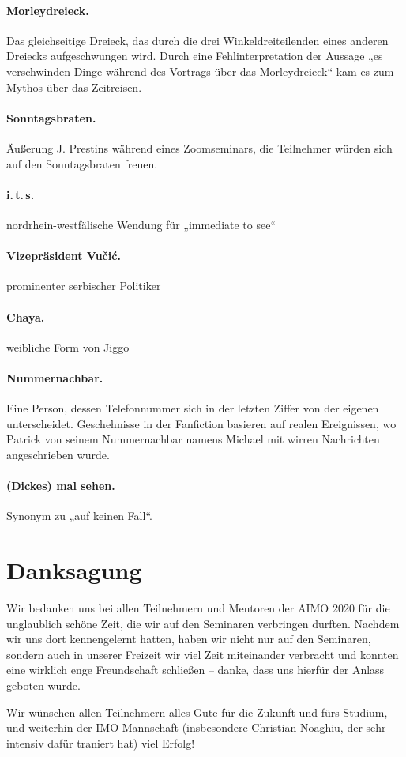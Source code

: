 \documentclass[oneside]{memoir}
\begin{document}
\paragraph{Morleydreieck.} Das gleichseitige Dreieck, das durch die drei Winkeldreiteilenden eines anderen Dreiecks aufgeschwungen wird. Durch eine Fehlinterpretation der Aussage „es verschwinden Dinge während des Vortrags  über das Morleydreieck“ kam es zum Mythos über das Zeitreisen.

\paragraph{Sonntagsbraten.} Äußerung J. Prestins während eines Zoomseminars, die Teilnehmer würden sich auf den Sonntagsbraten freuen.

\paragraph{i.\,t.\,s.} nordrhein-westfälische Wendung für „immediate to see“

\paragraph{Vizepräsident Vučić.} prominenter serbischer Politiker

\paragraph{Chaya.} weibliche Form von Jiggo

\paragraph{Nummernachbar.} Eine Person, dessen Telefonnummer sich in der letzten Ziffer von der eigenen unterscheidet. Geschehnisse in der Fanfiction basieren auf realen Ereignissen, wo Patrick von seinem Nummernachbar namens Michael mit wirren Nachrichten angeschrieben wurde.

\paragraph{(Dickes) mal sehen.} Synonym zu „auf keinen Fall“.

\newpage
\section*{Danksagung}

Wir bedanken uns bei allen Teilnehmern und Mentoren der AIMO 2020 für die unglaublich schöne Zeit, die wir auf den Seminaren verbringen durften. Nachdem wir uns dort kennengelernt hatten, haben wir nicht nur auf den Seminaren, sondern auch in unserer Freizeit wir viel Zeit miteinander verbracht und konnten eine wirklich enge Freundschaft schließen -- danke, dass uns hierfür der Anlass geboten wurde.

Wir wünschen allen Teilnehmern alles Gute für die Zukunft und fürs Studium, und weiterhin der IMO-Mannschaft (insbesondere Christian Noaghiu, der sehr intensiv dafür traniert hat) viel Erfolg!
\end{document}
